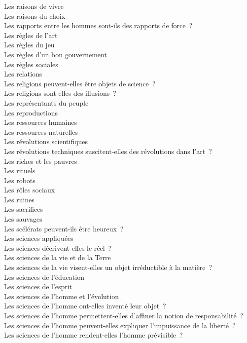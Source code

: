 \documentclass[a4paper,12pt]{article}
\begin{document}
Les raisons de vivre \\
Les raisons du choix \\
Les rapports entre les hommes sont-ils des rapports de force ? \\
Les règles de l'art \\
Les règles du jeu \\
Les règles d'un bon gouvernement \\
Les règles sociales \\
Les relations \\
Les religions peuvent-elles être objets de science ? \\
Les religions sont-elles des illusions ? \\
Les représentants du peuple \\
Les reproductions \\
Les ressources humaines \\
Les ressources naturelles \\
Les révolutions scientifiques \\
Les révolutions techniques suscitent-elles des révolutions dans l'art ? \\
Les riches et les pauvres \\
Les rituels \\
Les robots \\
Les rôles sociaux \\
Les ruines \\
Les sacrifices \\
Les sauvages \\
Les scélérats peuvent-ils être heureux ? \\
Les sciences appliquées \\
Les sciences décrivent-elles le réel ? \\
Les sciences de la vie et de la Terre \\
Les sciences de la vie visent-elles un objet irréductible à la matière ? \\
Les sciences de l'éducation \\
Les sciences de l'esprit \\
Les sciences de l'homme et l'évolution \\
Les sciences de l'homme ont-elles inventé leur objet ? \\
Les sciences de l'homme permettent-elles d'affiner la notion de responsabilité ? \\
Les sciences de l'homme peuvent-elles expliquer l'impuissance de la liberté ? \\
Les sciences de l'homme rendent-elles l'homme prévisible ? \\
\end{document}
